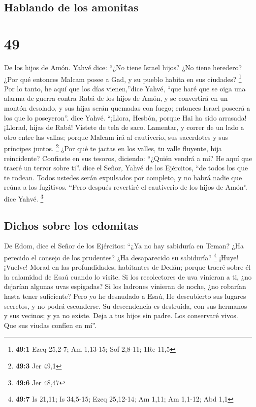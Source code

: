 \hypertarget{hablando-de-los-amonitas}{%
\subsection{Hablando de los amonitas}\label{hablando-de-los-amonitas}}

\hypertarget{section-48}{%
\section{49}\label{section-48}}

 De los hijos de Amón. Yahvé dice: ``¿No tiene Israel
hijos? ¿No tiene heredero? ¿Por qué entonces Malcam posee a Gad, y su
pueblo habita en sus ciudades? \footnote{\textbf{49:1} Ezeq 25,2-7; Am
  1,13-15; Sof 2,8-11; 1Re 11,5}  Por lo tanto, he aquí
que los días vienen,''dice Yahvé, ``que haré que se oiga una alarma de
guerra contra Rabá de los hijos de Amón, y se convertirá en un montón
desolado, y sus hijas serán quemadas con fuego; entonces Israel poseerá
a los que lo poseyeron''. dice Yahvé.  ``¡Llora, Hesbón,
porque Hai ha sido arrasada! ¡Llorad, hijas de Rabá! Vístete de tela de
saco. Lamentar, y correr de un lado a otro entre las vallas; porque
Malcam irá al cautiverio, sus sacerdotes y sus príncipes juntos.
\footnote{\textbf{49:3} Jer 49,1}  ¿Por qué te jactas en
los valles, tu valle fluyente, hija reincidente? Confiaste en sus
tesoros, diciendo: ``¿Quién vendrá a mí?  He aquí que
traeré un terror sobre ti''. dice el Señor, Yahvé de los Ejércitos, ``de
todos los que te rodean. Todos ustedes serán expulsados por completo, y
no habrá nadie que reúna a los fugitivos.  ``Pero después
revertiré el cautiverio de los hijos de Amón''. dice Yahvé. \footnote{\textbf{49:6}
  Jer 48,47}

\hypertarget{dichos-sobre-los-edomitas}{%
\subsection{Dichos sobre los edomitas}\label{dichos-sobre-los-edomitas}}

 De Edom, dice el Señor de los Ejércitos: ``¿Ya no hay
sabiduría en Teman? ¿Ha perecido el consejo de los prudentes? ¿Ha
desaparecido su sabiduría? \footnote{\textbf{49:7} Is 21,11; Is 34,5-15;
  Ezeq 25,12-14; Am 1,11; Am 1,1-12; Abd 1,1}  ¡Huye!
¡Vuelve! Morad en las profundidades, habitantes de Dedán; porque traeré
sobre él la calamidad de Esaú cuando lo visite.  Si los
recolectores de uva vinieran a ti, ¿no dejarían algunas uvas espigadas?
Si los ladrones vinieran de noche, ¿no robarían hasta tener suficiente?
 Pero yo he desnudado a Esaú, He descubierto sus lugares
secretos, y no podrá esconderse. Su descendencia es destruida, con sus
hermanos y sus vecinos; y ya no existe.  Deja a tus hijos
sin padre. Los conservaré vivos. Que sus viudas confíen en mí''.

